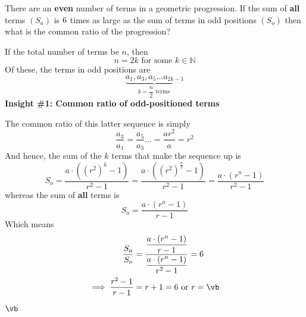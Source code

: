 

\SUBTRACT{}\vb

\question[3] There are an \textbf{even} number of terms in a geometric progression. 
If the sum of \textbf{all} terms $(S_a)$ is $6$ times as large as the sum of terms in odd positions $(S_o)$
then what is the common ratio of the progression?

\watchout

\begin{solution}[\halfpage]
  If the total number of terms be $n$, then 
  \[ n = 2k \text{ for some } k\in\mathbb{N} \]
  Of these, the terms in odd positions are 
  \[ \underbrace{a_1, a_3, a_5\ldots a_{2k-1}}_{k=\dfrac{n}{2}\text{ terms }} \] 
  \textbf{Insight \#1: Common ratio of odd-positioned terms}

  The common ratio of this latter sequence is simply
  \[ \dfrac{a_3}{a_1} = \dfrac{a_5}{a_3} \ldots = \dfrac{ar^2}{a} = r^2 \]
  And hence, the sum of the $k$ terms that make the sequence up is 
  \[ S_o = \dfrac{a\cdot((r^2)^k - 1)}{r^2-1} = \dfrac{a\cdot ((r^2)^{\frac{n}{2}}-1)}{r^2-1} = \dfrac{a\cdot (r^n-1)}{r^2-1} \]
  whereas the sum of \textbf{all} terms is 
  \[ S_a = \dfrac{a\cdot (r^n-1)}{r-1} \]
  Which means 
  \begin{align}
    \dfrac{S_a}{S_o} &= \dfrac{\dfrac{a\cdot(r^n-1)}{r-1}}{\dfrac{a\cdot(r^n-1)}{r^2-1}} = \va \\
    \implies \dfrac{r^2-1}{r-1} &= r + 1 = \va\text{ or } r = \vb
  \end{align}
\end{solution}

\ifprintanswers\begin{codex}$\vb$\end{codex}\fi

